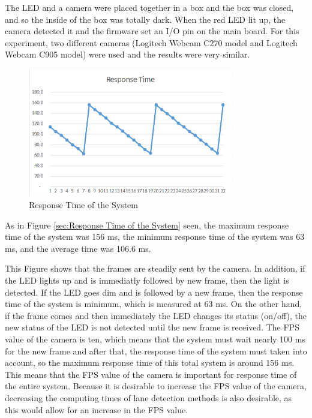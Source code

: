 The LED and a camera were placed together in a box and the box was closed, and so the inside of the box was totally dark. When the red LED lit up, the camera detected it and the firmware set an I/O pin on the main board. For this experiment, two different cameras (Logitech Webcam C270 model and Logitech Webcam C905 model) were used and the results were very similar.


\begin{figure}[H]
 \centering
  \includegraphics[width=0.8\textwidth]{./Bilder/Response_Time2.png}		 \caption{Response Time of the System} 
  \label{fig:Response_Time_of_the_System}
\end{figure}


As in Figure \ref{sec:Response Time of the System} seen, the maximum response time of the system was 156 ms, the minimum response time of the system was 63 ms, and the average time was 106.6 ms.

This Figure shows that the frames are steadily sent by the camera. In addition, if the LED lights up and is immediatly followed by new frame, then the light is detected. If the LED goes dim and is followed by a new frame, then the response time of the system is minimum, which is measured at 63 ms. On the other hand, if the frame comes and then immediately the LED changes its status (on/off), the new status of the LED is not detected until the new frame is received. The FPS value of the camera is ten, which means that the system must wait nearly 100 ms for the new frame and after that, the response time of the system must taken into account, so the maximum response time of this total system is around 156 ms. This means that the FPS value of the camera is important for response time of the entire system. Because it is desirable to increase the FPS value of the camera, decreasing the computing times of lane detection methods is also desirable, as this would allow for an increase in the FPS value.




